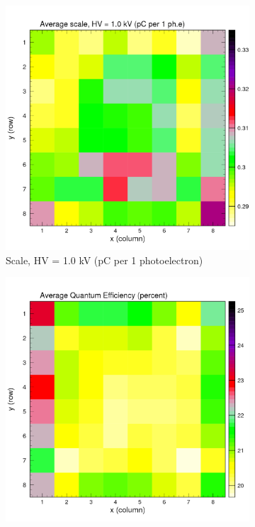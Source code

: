 \begin{figure}[t!]
	\centering
	\begin{subfigure}[c]{0.48\linewidth}
		\centering
		\includegraphics[width=\linewidth]{figures/pglobal_sc2d_r.pdf}
		\caption{Scale, HV = 1.0 kV (pC per 1 photoelectron)}
		\vspace{0mm}
	\end{subfigure}%
	\begin{subfigure}[c]{0.48\linewidth}
		\centering
		\includegraphics[width=\linewidth]{figures/pglobal_qf_r.pdf}

\end{subfigure}
\end{figure}
